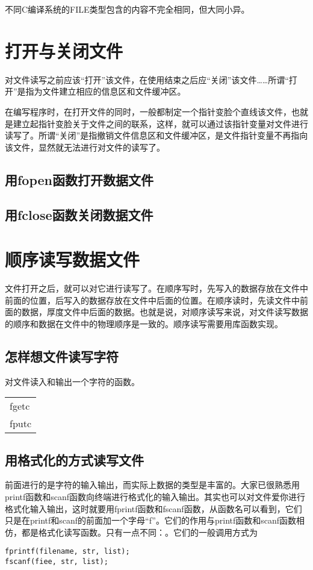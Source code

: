 不同C编译系统的FILE类型包含的内容不完全相同，但大同小异。
\section{打开与关闭文件}
对文件读写之前应该“打开”该文件，在使用结束之后应“关闭”该文件……所谓“打开”是指为文件建立相应的信息区和文件缓冲区。

在编写程序时，在打开文件的同时，一般都制定一个指针变脸个直线该文件，也就是建立起指针变脸关于文件之间的联系，这样，就可以通过该指针变量对文件进行读写了。所谓“关闭”是指撤销文件信息区和文件缓冲区，是文件指针变量不再指向该文件，显然就无法进行对文件的读写了。
\subsection{用fopen函数打开数据文件}
\subsection{用fclose函数关闭数据文件}
\section{顺序读写数据文件}
文件打开之后，就可以对它进行读写了。在顺序写时，先写入的数据存放在文件中前面的位置，后写入的数据存放在文件中后面的位置。在顺序读时，先读文件中前面的数据，厚度文件中后面的数据。也就是说，对顺序读写来说，对文件读写数据的顺序和数据在文件中的物理顺序是一致的。顺序读写需要用库函数实现。
\subsection{怎样想文件读写字符}
对文件读入和输出一个字符的函数。
\begin{table}
	\begin{tabular}{l}
		\hline
		fgetc \\
		fputc \\
		\hline
	\end{tabular}
\end{table}
\subsection{用格式化的方式读写文件}
前面进行的是字符的输入输出，而实际上数据的类型是丰富的。大家已很熟悉用printf函数和scanf函数向终端进行格式化的输入输出。其实也可以对文件爱你进行格式化输入输出，这时就要用fprintf函数和fscanf函数，从函数名可以看到，它们只是在printf和scanf的前面加一个字母“f”。它们的作用与printf函数和scanf函数相仿，都是格式化读写函数。只有一点不同：。它们的一般调用方式为
\begin{lstlisting}
fprintf(filename, str, list);
fscanf(fiee, str, list);
\end{lstlisting}
